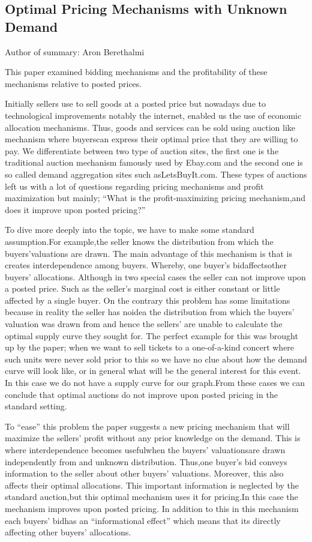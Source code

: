 \documentclass[12pt]{report}
\numberwithin{equation}{section}
\begin{document}
\newpage

\subsection{Optimal Pricing Mechanisms with Unknown Demand}

Author of summary: Aron Berethalmi

This paper examined bidding mechanisms and the profitability of these mechanisms relative to posted prices. 

Initially sellers use to sell goods at a posted price but nowadays due to technological improvements notably the internet, enabled us the use of economic allocation mechanisms.  Thus, goods and services can be sold using auction like mechanism where buyerscan express their optimal price that they are willing to pay. We differentiate between two type of auction sites, the first one is the traditional auction mechanism famously used by Ebay.com and the second one is so called demand aggregation sites such asLetsBuyIt.com. These types of auctions left us with a lot of questions regarding pricing mechanisms and profit maximization but mainly; “What is the profit-maximizing pricing mechanism,and does it improve upon posted pricing?”

To dive more deeply into the topic, we have to make some standard assumption.For example,the seller knows the distribution from which the buyers’valuations are drawn. The main advantage of this mechanism is that is creates interdependence among buyers. Whereby, one buyer’s bidaffectsother buyers’ allocations. Although in two special cases the seller can not improve upon a posted price. Such as the seller’s marginal cost is either constant or little affected by a single buyer. On the contrary this problem has some limitations because in reality the seller has noidea the distribution from which the buyers’ valuation was drawn from and hence the sellers’ are unable to calculate the optimal supply curve they sought for. The perfect example for this was brought up by the paper; when we want to sell tickets to a one-of-a-kind concert where such units were never sold prior to this so we have no clue about how the demand curve will look like, or in general what will be the general interest for this event. In this case we do not have a supply curve for our graph.From these cases we can conclude that optimal auctions do not improve upon posted pricing in the standard setting.

To “ease” this problem the paper suggests a new pricing mechanism that will maximize the sellers’ profit without any prior knowledge on the demand. This is where interdependence becomes usefulwhen the buyers’ valuationsare drawn independently from and unknown distribution. Thus,one buyer’s bid conveys information to the seller about other buyers’ valuations. Moreover, this also affects their optimal allocations. This important information is neglected by the standard auction,but this optimal mechanism uses it for pricing.In this case the mechanism improves upon posted pricing. In addition to this in this mechanism each buyers’ bidhas an “informational effect” which means that its directly affecting other buyers’ allocations.
\end{document}
